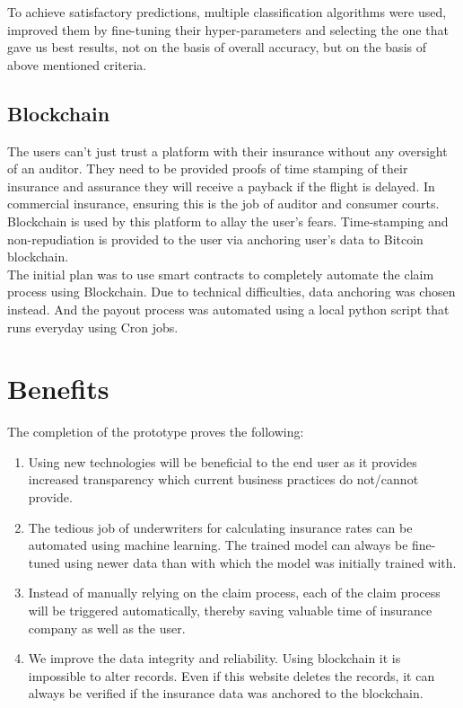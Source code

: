 To achieve satisfactory predictions, multiple classification algorithms were used, improved them by fine-tuning their hyper-parameters and selecting the one that gave us best results, not on the basis of overall accuracy, but on the basis of above mentioned criteria.

\subsection{Blockchain}
The users can't just trust a platform with their insurance without any oversight of an auditor. They need to be provided proofs of time stamping of their insurance and assurance they will receive a payback if the flight is delayed. In commercial insurance, ensuring this is the job of auditor and consumer courts. Blockchain is used by this platform to allay the user's fears. Time-stamping and non-repudiation is provided to the user via anchoring user's data to Bitcoin blockchain. 
\\The initial plan was to use smart contracts to completely automate the claim process using Blockchain. Due to technical difficulties, data anchoring was chosen instead. And the payout process was automated using a local python script that runs everyday using Cron jobs. 


\section{Benefits}
The completion of the prototype proves the following:
\begin{enumerate}
    \item Using new technologies will be beneficial to the end user as it provides increased transparency which current business practices do not/cannot provide.
    \item The tedious job of underwriters for calculating insurance rates can be automated using machine learning. The trained model can always be fine-tuned using newer data than with which the model was initially trained with. 
    \item Instead of manually relying on the claim process, each of the claim process will be triggered automatically, thereby saving valuable time of insurance company as well as the user.
    \item We improve the data integrity and reliability. Using blockchain it is impossible to alter records. Even if this website deletes the records, it can always be verified if the insurance data was anchored to the blockchain.
\end{enumerate}

